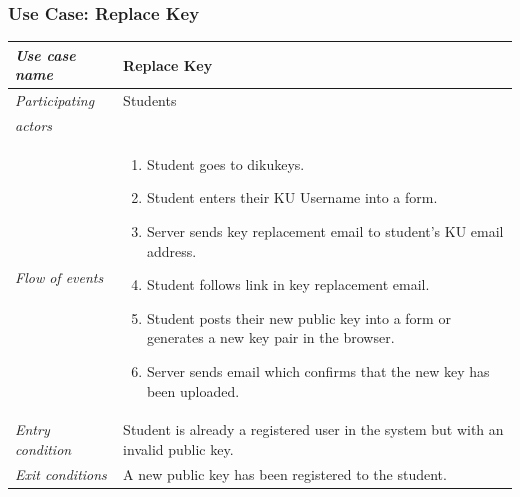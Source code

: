 \documentclass[11pt,a4paper]{report}
\begin{document}
\subsubsection{Use Case: Replace Key}
\begin{tabular}{l p{}}
    \toprule
    \textit{Use case name} & Replace Key \\
    \midrule
    \textit{Participating} & Students \\
    \textit{actors} & \\
    \midrule
    \textit{Flow of events} &
    \vspace{-6.7mm} \begin{enumerate}
        \item Student goes to dikukeys.
        \item Student enters their KU Username into a form.
        \item Server sends key replacement email to student's KU email address.
        \item Student follows link in key replacement email.
        \item Student posts their new public key into a form or generates a new key pair in the browser.
        \item Server sends email which confirms that the new key has been uploaded.
    \end{enumerate}
    \\
    \midrule
    \textit{Entry condition} & Student is already a registered user in the system but with an invalid public key. \\
    \midrule
    \textit{Exit conditions} & A new public key has been registered to the student. \\
    \bottomrule
\end{tabular}
\end{document}
